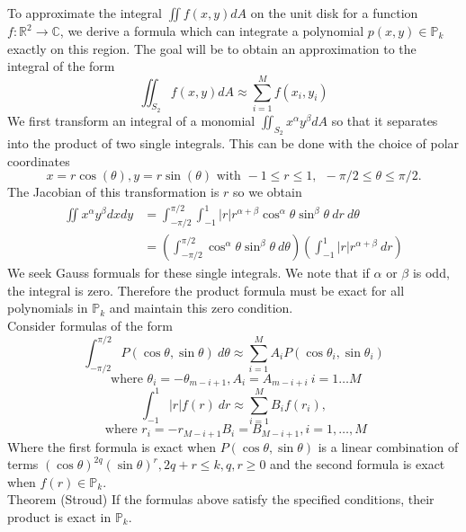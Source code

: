 \documentclass[10pt,a4paper]{letter}
\begin{document}
 

To approximate the integral $\iint f(x,y) dA$ on the unit disk for a function\\ $f: \mathbb{R}^2 \to \mathbb{C}$, we derive a formula which can integrate a polynomial $p(x,y) \in \mathbb{P}_k$ exactly on this region.  The goal will be to obtain an approximation to the integral of the form
$$\iint_{S_2} f(x,y) dA \approx \sum_{i=1}^M f(x_i, y_i)$$ 
We first transform an integral of a monomial $\iint_{S_2} x^\alpha y^\beta dA$ so that it separates into the product of two single integrals.  This can be done with the choice of polar coordinates
$$x = r \cos(\theta), y = r \sin(\theta) \text{ with } -1 \leq r \leq 1,\ \  -\pi/2 \leq \theta \leq \pi/2.$$
The Jacobian of this transformation is $r$ so we obtain
\begin{align*}
\iint x^\alpha y^\beta dx dy &= \int_{-\pi/2}^{\pi/2} \int_{-1}^1 |r| r^{\alpha + \beta} \cos^\alpha \theta \sin^\beta \theta\ dr \ d\theta\\
 &= \left(\int_{-\pi/2}^{\pi/2} \cos^\alpha \theta \sin^\beta \theta \ d\theta\right)\left( \int_{-1}^1 |r| r^{\alpha + \beta} \ dr \right)
\end{align*}
We seek Gauss formuals for these single integrals.  We note that if $\alpha$ or $\beta$ is odd, the integral is zero.  Therefore the product formula must be exact for all polynomials in $\mathbb{P}_k$ and maintain this zero condition.\\

Consider formulas of the form
$$\int_{-\pi/2}^{\pi/2} P(\cos \theta, \sin \theta)\ d\theta \approx \sum_{i=1}^M A_i P(\cos \theta_i, \sin \theta_i)$$
$$ \text{ where } \theta_i = -\theta_{m-i+1}, A_i = A_{m-i+i}\ i = 1 \dots M$$
$$\int_{-1}^1 |r| f(r)\ dr \approx \sum_{i=1}^M B_i f(r_i),$$ $$\text{ where } r_i = -r_{M-i+1} B_i=B_{M-i+1}, i=1,\dots,M$$
Where the first formula is exact when $P(\cos\theta, \sin\theta)$ is a linear combination of terms $(\cos \theta)^{2q}(\sin\theta)^r, 2q+r \leq k, q, r \geq 0$ and the second formula is exact when $f(r) \in \mathbb{P}_k.$\\

Theorem (Stroud) If the formulas above satisfy the specified conditions, their product is exact in $\mathbb{P}_k.$\\
\end{document}
